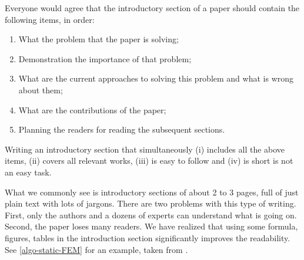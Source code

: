 \documentclass[authoryear,3p,times,preprint,review,fleqn]{elsarticle}
\numberwithin{equation}{section}
\theoremstyle{remark}
\begin{document}
Everyone would agree that the introductory section of a paper should contain the following items, in order:

\begin{enumerate}
\item What the problem that the paper is solving;
\item Demonstration the importance of that problem;
\item What are the current approaches to solving this problem and what is wrong about them;
\item What are the contributions of the paper; 
\item Planning  the readers for reading the subsequent sections.
\end{enumerate}

Writing an introductory section that simultaneously (i) includes all the above items, (ii) covers all relevant works, (iii) is easy to follow and (iv) is short is not an easy task.

What we commonly see is introductory sections of about 2 to 3 pages, full of just plain text with lots of jargons. There are two problems with this type of writing. First, only the authors and a dozens of experts can understand what is going on. Second, the paper loses many readers. We have realized that using some formula, figures, tables in the introduction section significantly improves the readability.
See \cref{algo-static-FEM} for an example, taken from \cite{Mandal:EFM2019}.
\end{document}
